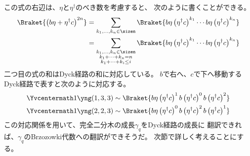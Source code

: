{	\begin{todo}[保留]\label{todo:保留} %
	この式の右辺は、$\eta$と$\eta^\dag$のべき数を考慮すると、
	次のように書くことができる。
	\begin{equation*}\begin{split}
		\Braket{\lr{b\eta + \eta^\dag c}^{2n}}
		&= \sum_{k_1,\dots,k_n\in\sizen} \Braket{b\eta\lr{\eta^\dag c}^{k_1}
			\cdots b\eta\lr{\eta^\dag c}^{k_n}} \\
		&= \sum_{\substack{k_1,\dots,k_n\in\sizen \\
		k_1 +\cdots+ k_n = n \\
		k_1 +\cdots+ k_i \le i \\
		}}\Braket{b\eta\lr{\eta^\dag c}^{k_1}
			\cdots b\eta\lr{\eta^\dag c}^{k_n}}
	\end{split}\end{equation*}
	二つ目の式の和はDyck経路の和に対応している。
	$b$で右へ、$c$で下へ移動するDyck経路で表すと次のように対応する。
	\begin{equation*}\begin{split}
		\Yvcentermath1
		\yng(1,3,3) &\sim \Braket{b\eta\lr{\eta^\dag c}^1
			b\lr{\eta^\dag c}^0 b\lr{\eta^\dag c}^2} \\
		\Yvcentermath1
		\yng(2,2,3) &\sim \Braket{b\eta\lr{\eta^\dag c}^0
			b\lr{\eta^\dag c}^2 b\lr{\eta^\dag c}^1}
	\end{split}\end{equation*}
	この対応関係を用いて、完全二分木の成長$\gamma_q$をDyck経路の成長に
	翻訳できれば、$\gamma_q$のBrzozowki代数への翻訳ができそうだ。
	次節で詳しく考えることにする。
	\end{todo} %

}
